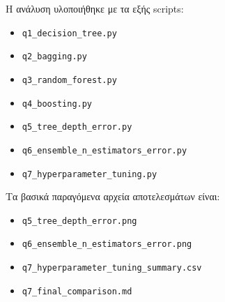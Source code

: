 \documentclass[12pt,a4paper]{article}
\newcommand{\code}[1]{\texttt{\textenglish{#1}}}
\begin{document}
Η ανάλυση υλοποιήθηκε με τα εξής scripts:

\begin{itemize}[nosep]
    \item \code{q1\_decision\_tree.py}
    \item \code{q2\_bagging.py}
    \item \code{q3\_random\_forest.py}
    \item \code{q4\_boosting.py}
    \item \code{q5\_tree\_depth\_error.py}
    \item \code{q6\_ensemble\_n\_estimators\_error.py}
    \item \code{q7\_hyperparameter\_tuning.py}
\end{itemize}

Τα βασικά παραγόμενα αρχεία αποτελεσμάτων είναι:

\begin{itemize}[nosep]
    \item \code{q5\_tree\_depth\_error.png}
    \item \code{q6\_ensemble\_n\_estimators\_error.png}
    \item \code{q7\_hyperparameter\_tuning\_summary.csv}
    \item \code{q7\_final\_comparison.md}
\end{itemize}
\end{document}
